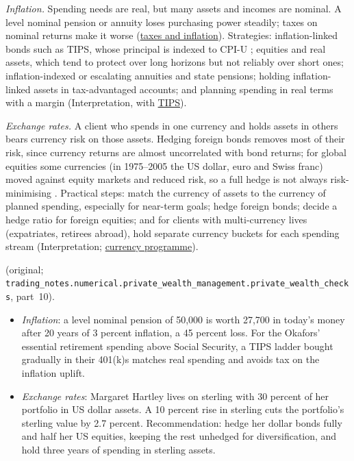 \begin{qfmethod}\label{meth:purchasing-power-fx}
 \emph{Inflation.} Spending needs are real, but many assets and incomes are nominal. A level nominal pension or annuity loses purchasing power steadily; taxes on nominal returns make it worse (\hyperref[meth:private-client-tax-inflation]{taxes and inflation}). Strategies: inflation-linked bonds such as TIPS, whose principal is indexed to CPI-U \citep[web page]{treasurydirect-tips}; equities and real assets, which tend to protect over long horizons but not reliably over short ones; inflation-indexed or escalating annuities and state pensions; holding inflation-linked assets in tax-advantaged accounts; and planning spending in real terms with a margin (Interpretation, with \hyperref[def:tips-breakevens]{TIPS}).

\emph{Exchange rates.} A client who spends in one currency and holds assets in others bears currency risk on those assets. Hedging foreign bonds removes most of their risk, since currency returns are almost uncorrelated with bond returns; for global equities some currencies (in 1975--2005 the US dollar, euro and Swiss franc) moved against equity markets and reduced risk, so a full hedge is not always risk-minimising \citep[NBER WP 13088, pp.~1--3]{campbell-viceira-currency-hedging-2007}. Practical steps: match the currency of assets to the currency of planned spending, especially for near-term goals; hedge foreign bonds; decide a hedge ratio for foreign equities; and for clients with multi-currency lives (expatriates, retirees abroad), hold separate currency buckets for each spending stream (Interpretation; \hyperref[meth:currency-hedging-programme]{currency programme}).

 (original; \nolinkurl{trading_notes.numerical.private_wealth_management.private_wealth_checks}, part~10).
\begin{itemize}
\item \emph{Inflation}: a level nominal pension of 50,000 is worth 27,700 in today's money after 20 years of 3 percent inflation, a 45 percent loss. For the Okafors' essential retirement spending above Social Security, a TIPS ladder bought gradually in their 401(k)s matches real spending and avoids tax on the inflation uplift.
\item \emph{Exchange rates}: Margaret Hartley lives on sterling with 30 percent of her portfolio in US dollar assets. A 10 percent rise in sterling cuts the portfolio's sterling value by 2.7 percent. Recommendation: hedge her dollar bonds fully and half her US equities, keeping the rest unhedged for diversification, and hold three years of spending in sterling assets.
\end{itemize}


\end{qfmethod}
